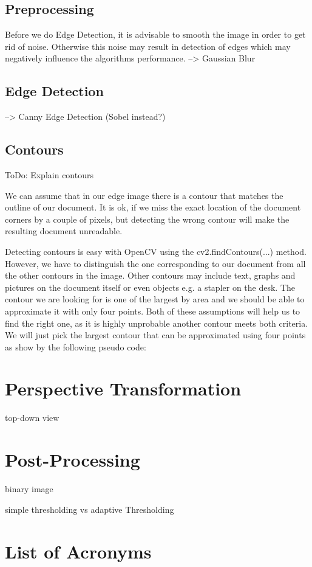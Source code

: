 \documentclass[bibliography=totoc]{scrartcl}
\begin{document}
		\subsection{Preprocessing}
		Before we do Edge Detection, it is advisable to smooth the image in order to get rid of noise. Otherwise this noise may result in detection of edges which may negatively influence the algorithms performance.
		--> Gaussian Blur
		\subsection{Edge Detection}
		--> Canny Edge Detection (Sobel instead?)
	
		\subsection{Contours}
		ToDo: Explain contours

		We can assume that in our edge image there is a contour that matches the outline of our document. 
		It is ok, if we miss the exact location of the document corners by a couple of pixels, but detecting the wrong contour will make the resulting document unreadable.

		Detecting contours is easy with OpenCV using the cv2.findContours(...) method.
		However, we have to distinguish the one corresponding to our document from all the other contours in the image.
		Other contours may include text, graphs and pictures on the document itself or even objects e.g. a stapler on the desk. 
		The contour we are looking for is one of the largest by area and we should be able to approximate it with only four points.
		Both of these assumptions will help us to find the right one, as it is highly unprobable another contour meets both criteria. 
		We will just pick the largest contour that can be approximated using four points as show by the following pseudo code:
		
	\section{Perspective Transformation}
	top-down view
	
	\section{Post-Processing}
	binary image

	simple thresholding vs adaptive Thresholding
			
\section*{List of Acronyms} 

\begin{acronym}[....]
\end{acronym}
			

\end{document}
